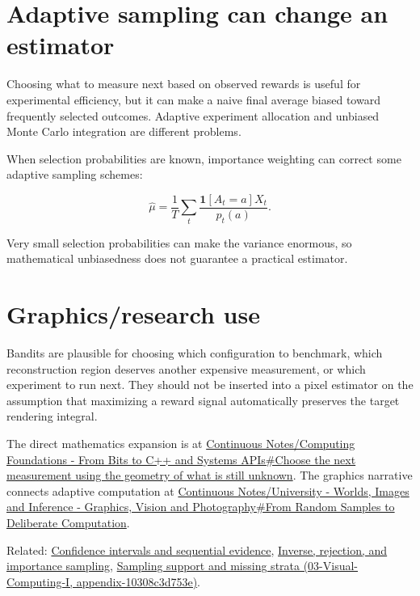 \section{Adaptive sampling can change an estimator}\label{appendix-3dc863dbddf3-adaptive-sampling-can-change-an-estimator}

Choosing what to measure next based on observed rewards is useful for experimental efficiency, but it can make a naive final average biased toward frequently selected outcomes. Adaptive experiment allocation and unbiased Monte Carlo integration are different problems.

When selection probabilities are known, importance weighting can correct some adaptive sampling schemes:

\[
\hat\mu=
\frac1T\sum_t
\frac{\mathbf 1[A_t=a]X_t}{p_t(a)}.
\]

Very small selection probabilities can make the variance enormous, so mathematical unbiasedness does not guarantee a practical estimator.

\section{Graphics/research use}\label{appendix-3dc863dbddf3-graphicsresearch-use}

Bandits are plausible for choosing which configuration to benchmark, which reconstruction region deserves another expensive measurement, or which experiment to run next. They should not be inserted into a pixel estimator on the assumption that maximizing a reward signal automatically preserves the target rendering integral.

The direct mathematics expansion is at \href{Continuous\%20Notes/Computing\%20Foundations\%20-\%20From\%20Bits\%20to\%20C++\%20and\%20Systems\%20APIs\#Choose\%20the\%20next\%20measurement\%20using\%20the\%20geometry\%20of\%20what\%20is\%20still\%20unknown}{Continuous Notes/Computing Foundations - From Bits to C++ and Systems APIs\#Choose the next measurement using the geometry of what is still unknown}. The graphics narrative connects adaptive computation at \href{Continuous\%20Notes/University\%20-\%20Worlds,\%20Images\%20and\%20Inference\%20-\%20Graphics,\%20Vision\%20and\%20Photography\#From\%20Random\%20Samples\%20to\%20Deliberate\%20Computation}{Continuous Notes/University - Worlds, Images and Inference - Graphics, Vision and Photography\#From Random Samples to Deliberate Computation}.

Related: \hyperref[appendix-c83016554b1e]{Confidence intervals and sequential evidence}, \hyperref[appendix-8d863ed954d0]{Inverse, rejection, and importance sampling}, \href{../03-Visual-Computing-I/main.pdf\#nameddest=appendix-10308c3d753e}{Sampling support and missing strata (03-Visual-Computing-I, appendix-10308c3d753e)}.
